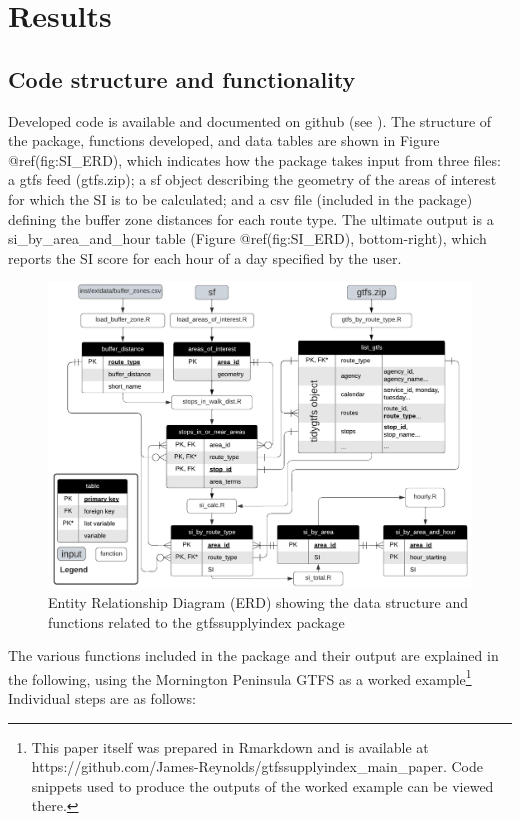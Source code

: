 \documentclass[preprint, 3p,
authoryear]{elsarticle} %
\begin{document}
\section{Results}\label{results}

\subsection{Code structure and
functionality}\label{code-structure-and-functionality}

Developed code is available and documented on github (see
\citet{gtfssupplyindex_github}). The structure of the package, functions
developed, and data tables are shown in Figure @ref(fig:SI\_ERD), which
indicates how the package takes input from three files: a gtfs feed
(gtfs.zip); a sf object describing the geometry of the areas of interest
for which the SI is to be calculated; and a csv file (included in the
package) defining the buffer zone distances for each route type. The
ultimate output is a si\_by\_area\_and\_hour table (Figure
@ref(fig:SI\_ERD), bottom-right), which reports the SI score for each
hour of a day specified by the user.

\begin{figure}
\includegraphics[width=1\linewidth]{graphics/SI_data_structure} \caption{Entity Relationship Diagram (ERD) showing the data structure and functions related to the gtfssupplyindex package}\label{fig:SI_ERD}
\end{figure}

The various functions included in the package and their output are
explained in the following, using the Mornington Peninsula GTFS as a
worked example\footnote{This paper itself was prepared in Rmarkdown and
  is available at
  https://github.com/James-Reynolds/gtfssupplyindex\_main\_paper. Code
  snippets used to produce the outputs of the worked example can be
  viewed there.} Individual steps are as follows:
\end{document}
